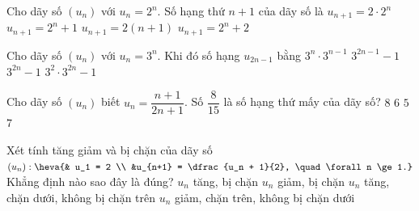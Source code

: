 \begin{ex}%
	Cho dãy số $(u_n)$ với $u_n=2^n$.  Số hạng thứ $n+1$ của dãy số là
	\choice 
		 {$u_{n+1}=2 \cdot 2^n$}
		 {$u_{n+1}=2^n+1$}
		 {$u_{n+1}=2(n+1)$}
		 {\True $u_{n+1}=2^n+2$}
\end{ex}

\begin{ex}%
	Cho dãy số  $(u_n)$ với $u_n=3^n$. Khi đó số hạng $u_{2n-1}$ bằng
	 \choice
		{\True $3^n  \cdot 3^{n-1}$}
		{$3^{2n-1}-1$} 
		{$3^{2n}-1$} 
		{$3^2 \cdot 3^{2n}-1$} 
\end{ex}

\begin{ex}%
	Cho dãy số $(u_n)$ biết $u_n=\dfrac{n+1}{2n+1}$. Số $\dfrac{8}{15}$ là số hạng thứ mấy của  dãy số?
	\choice 
		 {$8$}
		 {$6$}
		{$5$} 
		 {\True $7$}
\end{ex}

\begin{ex}%
	Xét tính tăng giảm và bị chặn của dãy  số $(u_n):
	\heva{&  u_1 = 2 \\
	&u_{n+1} = \dfrac{u_n + 1}{2}, \quad \forall n \ge 1.}$ Khẳng  định nào sao đây là đúng?
	\choice 
		 {$u_n$ tăng, bị chặn}
		{\True $u_n$ giảm,  bị chặn}
		{$u_n$ tăng, chặn dưới,  không bị chặn trên}
		 {$u_n$ giảm, chặn trên, không bị chặn dưới}
\end{ex}

